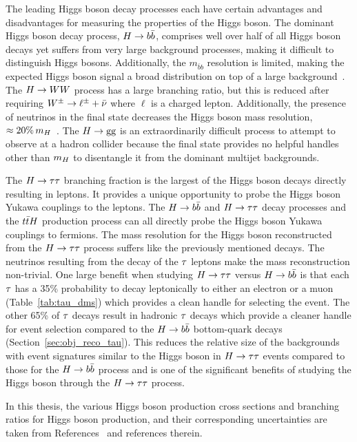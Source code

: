 The leading Higgs boson decay processes each have certain advantages and disadvantages
for measuring the properties of the Higgs boson. The dominant Higgs boson decay 
process, $H\to b\bar{b}$, comprises well over half of all Higgs boson decays yet suffers
from very large background processes, making it difficult to distinguish Higgs bosons.
Additionally, the $m_{\bar{b}b}$ resolution is limited, making the expected Higgs boson
signal a broad distribution on top of a large background~\cite{PDG}.
The $H\to WW$ process has a large branching ratio, but this is reduced after requiring
$W^{\pm}\to\ell^{\pm} + \bar{\nu}$ where $\ell$ is a charged lepton. Additionally, the presence of neutrinos
in the final state decreases the Higgs boson mass resolution, $\approx 20\% \, m_{H}$~\cite{PDG}.
The $H\to\text{g}\text{g}$ is an extraordinarily difficult process to attempt to observe at a
hadron collider because the final state provides no helpful handles other than $m_{H}$ to disentangle it from
the dominant multijet backgrounds. 

The $H\to\tau\tau$ branching fraction is the largest of the Higgs boson decays directly resulting in leptons.
It provides a unique opportunity to probe the Higgs boson Yukawa couplings to the leptons.
The $H\to b\bar{b}$ and $H\to\tau\tau$ decay processes and the $t\bar{t}H$ 
production process can all directly probe the Higgs boson Yukawa couplings to fermions.
The mass resolution for the Higgs boson reconstructed from the $H\to\tau\tau$ process suffers like
the previously mentioned decays. The neutrinos resulting from the decay of the $\tau$
leptons make the mass reconstruction non-trivial.
One large benefit when studying $H\to\tau\tau$ versus $H\to b\bar{b}$ is that each $\tau$
has a 35\% probability to decay leptonically to either an electron or a muon (Table~\ref{tab:tau_dms})
which provides a clean handle for selecting the event. The other 65\% of $\tau$ decays
result in hadronic $\tau$ decays which provide a cleaner handle for
event selection compared to the $H\to b\bar{b}$ bottom-quark decays (Section~\ref{sec:obj_reco_tau}).
This reduces the relative size of the backgrounds with event signatures similar to the Higgs boson
in $H\to\tau\tau$ events compared to those for the $H\to b\bar{b}$ process and is one
of the significant benefits of studying the Higgs boson through the $H\to\tau\tau$ process.

In this thesis, the various Higgs boson production cross sections and branching ratios
for Higgs boson production, and their corresponding uncertainties are taken from 
References~\cite{deFlorian:2016spz,Denner:2011mq,Ball:2011mu} and references therein.


